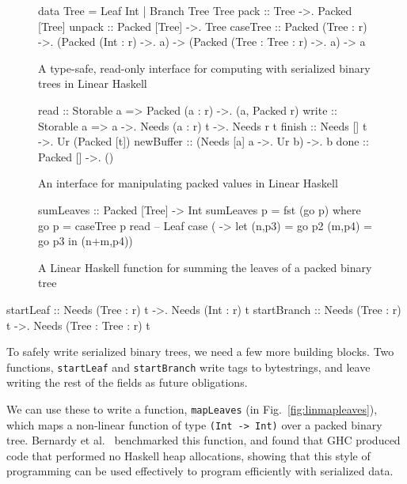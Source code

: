 \documentclass[showabstract,showacknowledgments,showpreface,showdedication,school]{iuphd}
\theoremstyle{nonumberplain}
\newcommand{\Figref}[1]{Fig.~\ref{#1}}
\newcommand{\il}[1]{\lstinline[style=inline,mathescape=true];#1;}
\begin{document}
\begin{figure}
\begin{code}
data Tree = Leaf Int | Branch Tree Tree
pack :: Tree ->. Packed [Tree]
unpack :: Packed [Tree] ->. Tree
caseTree :: Packed (Tree : r) ->.
            (Packed (Int : r) ->. a) ->
            (Packed (Tree : Tree : r) ->. a) -> a
\end{code}
\caption{A type-safe, read-only interface for computing with serialized binary trees
  in Linear Haskell}
\label{fig:linpacktree}
\end{figure}
\begin{figure}
\begin{code}
read :: Storable a => Packed (a : r) ->. (a, Packed r)
write :: Storable a => a ->. Needs (a : r) t ->. Needs r t
finish :: Needs [] t ->. Ur (Packed [t])
newBuffer :: (Needs [a] a ->. Ur b) ->. b
done :: Packed [] ->. ()
\end{code}
\caption{An interface for manipulating packed values in Linear Haskell}
\label{fig:lininterface}
\end{figure}
\begin{figure}
\begin{code}
sumLeaves :: Packed [Tree] -> Int
sumLeaves p = fst (go p)
  where go p = caseTree p
           read -- Leaf case
           ( -> let (n,p3) = go p2
                       (m,p4) = go p3
                   in (n+m,p4))
\end{code}
\caption{A Linear Haskell function for summing the leaves of a packed
  binary tree}
\label{fig:linsumleaves}
\end{figure}

\begin{code}
startLeaf :: Needs (Tree : r) t ->. Needs (Int : r) t
startBranch :: Needs (Tree : r) t ->. Needs (Tree : Tree : r) t
\end{code}
To safely write serialized binary trees, we need a few more building blocks.
Two functions, \il{startLeaf} and \il{startBranch} write
tags to bytestrings, and leave writing the rest of the fields as future
obligations.


We can use these to write a function, \il{mapLeaves} (in \Figref{fig:linmapleaves}),
which maps a non-linear function of type \il{(Int -> Int)} over a packed
binary tree. Bernardy et al.~\cite{linear-haskell} benchmarked this function,
and found that GHC produced code that performed no Haskell heap allocations,
showing that this style of programming can be used effectively to program
efficiently with serialized data.
\end{document}
